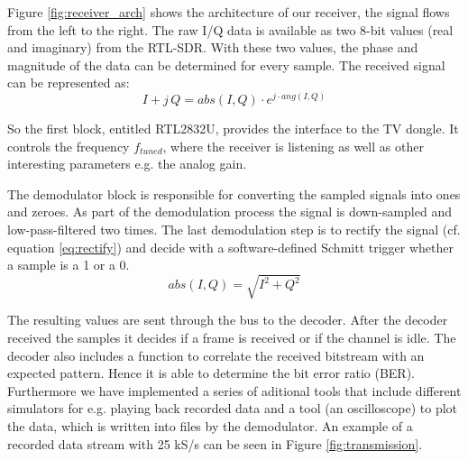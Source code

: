 \documentclass[conference]{IEEEtran}
\begin{document}
Figure \ref{fig:receiver_arch} shows the architecture of our receiver, the
signal flows from the left to the right.
The raw I/Q data is available as two 8-bit values (real and imaginary) from the
RTL-SDR. With these two values, the phase and magnitude of the data can be
determined for every sample. The received signal can be represented as:
\begin{equation}
	I+j\,Q = abs(I,Q) \cdot e^{j \cdot ang(I,Q)} 
\end{equation} 
 
So the first block, entitled RTL2832U, provides the interface to the TV
dongle. It controls the frequency \ensuremath{f_{tuned}}, where the
receiver is listening as well as other interesting parameters e.g. the analog gain.

The demodulator block is responsible for converting the sampled signals
into ones and zeroes. 
As part of the demodulation process the signal is down-sampled and
low-pass-filtered two times. The last demodulation step is to rectify
the signal (cf. equation \ref{eq:rectify}) and decide with a
software-defined Schmitt trigger whether a sample is a 1 or a 0.  
\begin{equation}
	\label{eq:rectify}
	abs(I,Q) = \sqrt{I^2 +  Q^2}
\end{equation} 

The resulting values are sent through the bus to the decoder. After the decoder
received the samples it decides if a frame is received or if the channel is
idle. The decoder also includes a function to correlate the received bitstream
with an expected pattern. Hence it is able to determine the bit error ratio
(BER). Furthermore we have implemented a series of aditional tools that include
different simulators for e.g. playing back recorded data and a tool (an
oscilloscope) to plot the data, which is written into files by the demodulator.
An example of a recorded data stream with 25 kS/s can be seen in Figure
\ref{fig:transmission}.  
\end{document}
